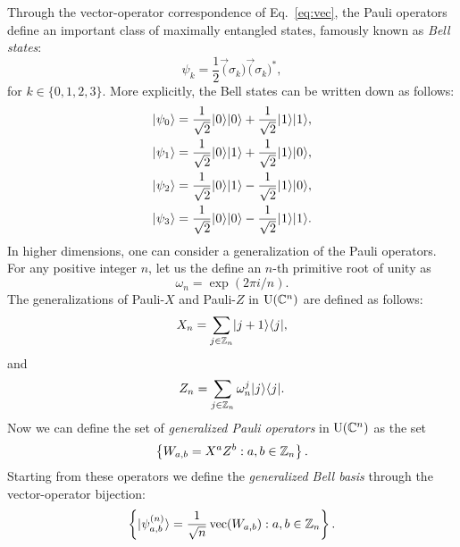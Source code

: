 Through the vector-operator correspondence of Eq.~\ref{eq:vec}, 
the Pauli operators define an important class of maximally
entangled states, famously known as \emph{Bell states}:
\begin{equation}
  \psi_{k} = \frac{1}{2}\vec(\sigma_{k})\vec(\sigma_{k})^{\ast},
\end{equation}
for $k \in \{0,1,2,3\}$. More explicitly, the Bell states can be written down as follows:
\begin{equation} 
\label{eq:Bell-states}
  \begin{aligned}
    \ket{\psi_0} & = \frac{1}{\sqrt{2}}\ket{0}\ket{0} 
    + \frac{1}{\sqrt{2}}\ket{1}\ket{1},\\
    \ket{\psi_1} & = \frac{1}{\sqrt{2}}\ket{0}\ket{1} 
    + \frac{1}{\sqrt{2}}\ket{1}\ket{0},\\
    \ket{\psi_2} & = \frac{1}{\sqrt{2}}\ket{0}\ket{1} 
    - \frac{1}{\sqrt{2}}\ket{1}\ket{0},\\
    \ket{\psi_3} & = \frac{1}{\sqrt{2}}\ket{0}\ket{0} 
    - \frac{1}{\sqrt{2}}\ket{1}\ket{1}.
  \end{aligned}
\end{equation}
In higher dimensions, one can consider a generalization of the Pauli operators.
For any positive integer $n$, let us the define an $n$-th primitive root of unity as 
\begin{equation}
  \omega_{n} = \exp(2\pi i/n).
\end{equation}
The generalizations of Pauli-$X$ and Pauli-$Z$ in $\mathrm{U}(\mathbb{C}^{n})$ 
are defined as follows:
\begin{equation}
  X_{n} = \sum_{j \in \mathbb{Z}_{n}}\lvert\mspace{0.5mu} j+1 \mspace{0.5mu} \rangle\langle\mspace{0.5mu} j \mspace{0.5mu} \rvert,
\end{equation}
and
\begin{equation}
  Z_{n} = \sum_{j \in \mathbb{Z}_{n}}\omega_{n}^{j}\lvert\mspace{0.5mu} j \mspace{0.5mu} \rangle\langle\mspace{0.5mu} j \mspace{0.5mu} \rvert.
\end{equation}
Now we can define the set of \emph{generalized Pauli operators} in $\mathrm{U}(\mathbb{C}^{n})$ as the set
\begin{equation}
\label{eq:generalized-Pauli-operators}
  \left\{ W_{a,b} = X^{a}Z^{b} : a,b\in\integer_{n}\right\}.
\end{equation}
Starting from these operators we define the \emph{generalized Bell basis}
through the vector-operator bijection:
\begin{equation}
\label{eq:generalized-bell-basis}
  \left\{ \ket{\psi_{a,b}^{(n)}} = \frac{1}{\sqrt{n}}\vec(W_{a,b}) : a,b\in\integer_{n} \right\}.
\end{equation}

